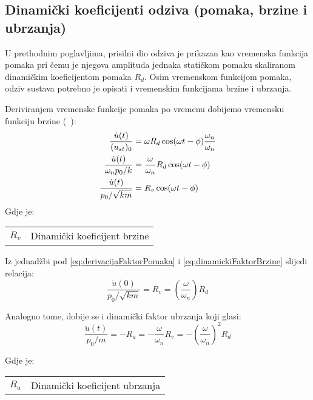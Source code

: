 \subsection{Dinamički koeficijenti odziva (pomaka, brzine i ubrzanja)}
U prethodnim poglavljima, prisilni dio odziva je prikazan kao vremenska funkcija pomaka
pri čemu je njegova amplituda jednaka statičkom pomaku skaliranom dinamičkim
koeficijentom pomaka $R_d$. Osim vremenskom funkcijom pomaka, odziv sustava potrebno
je opisati i vremenskim funkcijama brzine i ubrzanja.

Deriviranjem vremenske funkcije pomaka po vremenu dobijemo vremensku funkciju brzine (~\cite{chopra2011}):
    \begin{align}
        \frac{\dot{u}(t)}{(u_{st})_0} &= 
            \omega R_d\cos(\omega t - \phi)\frac{\omega_n}{\omega_n}\notag\\
        \frac{\dot{u}(t)}{\omega_n p_0/k} &= 
            \frac{\omega}{\omega_n}R_d\cos(\omega t-\phi)\label{eq:derivacijaFaktorPomaka}\\
        \frac{\dot{u}(t)}{p_0/\sqrt{km}} &=
            R_v\cos(\omega t-\phi)\label{eq:dinamickiFaktorBrzine}
    \end{align}
Gdje je:
\begin{table}[H]
    \begin{tabular}{r l}
        $R_v$ & Dinamički koeficijent brzine\\
    \end{tabular}
\end{table}

Iz jednadžbi pod \eqref{eq:derivacijaFaktorPomaka} i \eqref{eq:dinamickiFaktorBrzine}
slijedi relacija:
\begin{equation}\label{eq:R_v}
    \frac{\dot{u}(0)}{p_0/\sqrt{km}}=R_v=\left(\frac{\omega}{\omega_n}\right)R_d
\end{equation}

Analogno tome, dobije se i dinamički faktor ubrzanja koji glasi:
\begin{equation}\label{eq:R_a}
    \frac{\ddot{u}(t)}{p_0/m}=-R_a=-\frac{\omega}{\omega_n}R_v
        =-\left(\frac{\omega}{\omega_n}\right)^2R_d
\end{equation}

Gdje je:
\begin{table}[H]
    \begin{tabular}{r l}
        $R_a$ & Dinamički koeficijent ubrzanja\\
    \end{tabular}
\end{table}

